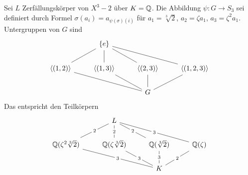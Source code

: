 \begin{Bsp}
    Sei $L$ Zerfällungskörper von $X^3-2$ über $K=\mathbb{Q}$. Die Abbildung 
    $\psi\colon G\to S_3$ sei definiert durch Formel $\sigma(a_i)=a_{\psi(\sigma)(i)}$ für $a_1=\sqrt[3]{2}$, $a_2=\zeta a_1$, $a_3=\zeta^2a_1$.
    Untergruppen von $G$ sind 
    $$%
\begin{tikzcd}
                               & \Set{e} \arrow[ld, no head] \arrow[d, no head] \arrow[rd, no head] \arrow[rrd, no head] &                              &                                 \\
{\anglebr{(1,2)}} \arrow[rrd, no head] & {\anglebr{(1,3)}} \arrow[rd, no head]                                                         & {\anglebr{(2,3)}} \arrow[d, no head] & {\anglebr{(1,2,3)}} \arrow[ld, no head] \\
                               &                                                                                       & G                            &                                
\end{tikzcd}$$
Das entspricht den Teilkörpern 
$$%
\begin{tikzcd}
                                                                & L \arrow[ld, "2" description, no head] \arrow[d, "2" description, no head] \arrow[rd, "2" description, no head] \arrow[rrd, "3" description, no head] &                                                        &                                                 \\
{\QQ(\zeta^2\sqrt[3]{2})} \arrow[rrd, "3" description, no head] & {\QQ(\zeta\sqrt[3]{2})} \arrow[rd, "3" description, no head]                                                                                          & {\QQ(\sqrt[3]{2})} \arrow[d, "3" description, no head] & \QQ(\zeta) \arrow[ld, "2" description, no head] \\
                                                                &                                                                                                                                                       & K                                                      &                                                
\end{tikzcd}$$
\end{Bsp}
